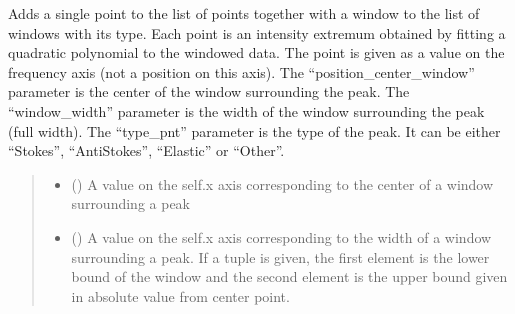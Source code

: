 \documentclass[letterpaper,10pt,english]{sphinxmanual}
\begin{document}
\begin{fulllineitems}
\begin{fulllineitems}
\label{\detokenize{source/_autosummary/HDF5_BLS_treat.Treat:HDF5_BLS_treat.Treat.add_point}}
\pysigstartsignatures
\pysiglinewithargsret
{}
{\sphinxparamcomma {}\sphinxparamcomma {}}
{}
\pysigstopsignatures
\sphinxAtStartPar
Adds a single point to the list of points together with a window to the list of windows with its type. Each point is an intensity extremum obtained by fitting a quadratic polynomial to the windowed data.
The point is given as a value on the frequency axis (not a position on this axis).
The “position\_center\_window” parameter is the center of the window surrounding the peak. The “window\_width” parameter is the width of the window surrounding the peak (full width). The “type\_pnt” parameter is the type of the peak. It can be either “Stokes”, “Anti\sphinxhyphen{}Stokes”, “Elastic” or “Other”.
\begin{quote}\begin{description}
\begin{itemize}
\item {} 
\sphinxAtStartPar
{} () \textendash{} A value on the self.x axis corresponding to the center of a window surrounding a peak

\item {} 
\sphinxAtStartPar
{} () \textendash{} A value on the self.x axis corresponding to the width of a window surrounding a peak. If a tuple is given, the first element is the lower bound of the window and the second element is the upper bound given in absolute value from center point.


\end{itemize}
\end{description}
\end{quote}
\end{fulllineitems}
\end{fulllineitems}
\end{document}
